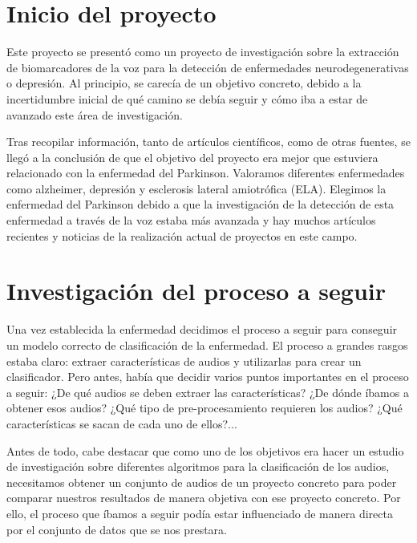 
\section{Inicio del proyecto}
Este proyecto se presentó como un proyecto de investigación sobre la extracción de biomarcadores de la voz para la detección de enfermedades neurodegenerativas o depresión. Al principio, se carecía de un objetivo concreto, debido a la incertidumbre inicial de qué camino se debía seguir y cómo iba a estar de avanzado este área de investigación.

Tras recopilar información, tanto de artículos científicos, como de otras fuentes, se llegó a la conclusión de que el objetivo del proyecto era mejor que estuviera relacionado con la enfermedad del Parkinson. Valoramos diferentes enfermedades como alzheimer, depresión y esclerosis lateral amiotrófica (ELA). Elegimos la enfermedad del Parkinson debido a que la investigación de la detección de esta enfermedad a través de la voz estaba más avanzada y hay muchos artículos recientes y noticias de la realización actual de proyectos en este campo. 

\section{Investigación del proceso a seguir}
Una vez establecida la enfermedad decidimos el proceso a seguir para conseguir un modelo correcto de clasificación de la enfermedad. El proceso a grandes rasgos estaba claro: extraer características de audios y utilizarlas para crear un clasificador. Pero antes, había que decidir varios puntos importantes en el proceso a seguir: ¿De qué audios se deben extraer las características? ¿De dónde íbamos a obtener esos audios? ¿Qué tipo de pre-procesamiento requieren los audios? ¿Qué características se sacan de cada uno de ellos?...

Antes de todo, cabe destacar que como uno de los objetivos era hacer un estudio de investigación sobre diferentes algoritmos para la clasificación de los audios, necesitamos obtener un conjunto de audios de un proyecto concreto para poder comparar nuestros resultados de manera objetiva con ese proyecto concreto. Por ello, el proceso que íbamos a seguir podía estar influenciado de manera directa por el conjunto de datos que se nos prestara.


